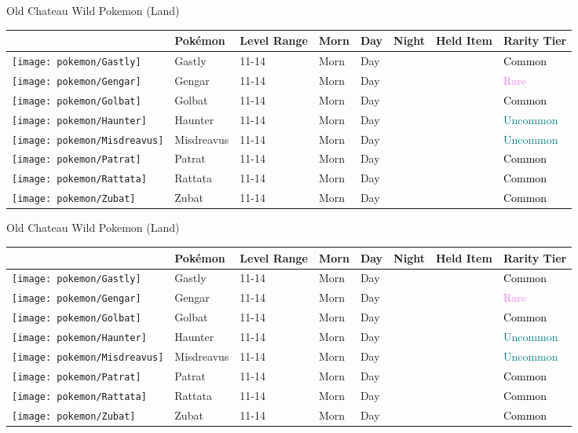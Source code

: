 \caption{Old Chateau Wild Pokemon (Land)}%
\begin{longtable}{||l l l l l l l l||}%
\hline%
&Pokémon&Level Range&Morn&Day&Night&Held Item&Rarity Tier\\%
\hline%
\endhead%
\hline%
\texttt{[image: pokemon/Gastly]}&Gastly&11{-}14&Morn&Day&&&\textcolor{black}{%
Common%
}\\%
\hline%
\texttt{[image: pokemon/Gengar]}&Gengar&11{-}14&Morn&Day&&&\textcolor{violet}{%
Rare%
}\\%
\hline%
\texttt{[image: pokemon/Golbat]}&Golbat&11{-}14&Morn&Day&&&\textcolor{black}{%
Common%
}\\%
\hline%
\texttt{[image: pokemon/Haunter]}&Haunter&11{-}14&Morn&Day&&&\textcolor{teal}{%
Uncommon%
}\\%
\hline%
\texttt{[image: pokemon/Misdreavus]}&Misdreavus&11{-}14&Morn&Day&&&\textcolor{teal}{%
Uncommon%
}\\%
\hline%
\texttt{[image: pokemon/Patrat]}&Patrat&11{-}14&Morn&Day&&&\textcolor{black}{%
Common%
}\\%
\hline%
\texttt{[image: pokemon/Rattata]}&Rattata&11{-}14&Morn&Day&&&\textcolor{black}{%
Common%
}\\%
\hline%
\texttt{[image: pokemon/Zubat]}&Zubat&11{-}14&Morn&Day&&&\textcolor{black}{%
Common%
}\\%
\hline%
\end{longtable}%
\caption{Old Chateau Wild Pokemon (Land)}%
\begin{longtable}{||l l l l l l l l||}%
\hline%
&Pokémon&Level Range&Morn&Day&Night&Held Item&Rarity Tier\\%
\hline%
\endhead%
\hline%
\texttt{[image: pokemon/Gastly]}&Gastly&11{-}14&Morn&Day&&&\textcolor{black}{%
Common%
}\\%
\hline%
\texttt{[image: pokemon/Gengar]}&Gengar&11{-}14&Morn&Day&&&\textcolor{violet}{%
Rare%
}\\%
\hline%
\texttt{[image: pokemon/Golbat]}&Golbat&11{-}14&Morn&Day&&&\textcolor{black}{%
Common%
}\\%
\hline%
\texttt{[image: pokemon/Haunter]}&Haunter&11{-}14&Morn&Day&&&\textcolor{teal}{%
Uncommon%
}\\%
\hline%
\texttt{[image: pokemon/Misdreavus]}&Misdreavus&11{-}14&Morn&Day&&&\textcolor{teal}{%
Uncommon%
}\\%
\hline%
\texttt{[image: pokemon/Patrat]}&Patrat&11{-}14&Morn&Day&&&\textcolor{black}{%
Common%
}\\%
\hline%
\texttt{[image: pokemon/Rattata]}&Rattata&11{-}14&Morn&Day&&&\textcolor{black}{%
Common%
}\\%
\hline%
\texttt{[image: pokemon/Zubat]}&Zubat&11{-}14&Morn&Day&&&\textcolor{black}{%
Common%
}\\%
\hline%
\end{longtable}%
